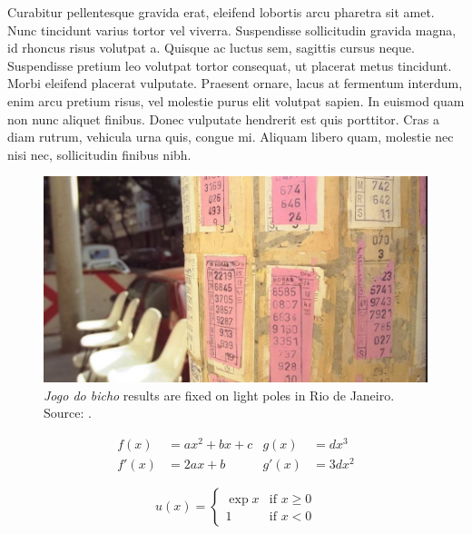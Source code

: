 \documentclass[a4paper,12pt]{article}
\begin{document}
Curabitur pellentesque gravida erat, eleifend lobortis arcu pharetra sit amet. Nunc tincidunt varius tortor vel viverra. Suspendisse sollicitudin gravida magna, id rhoncus risus volutpat a. Quisque ac luctus sem, sagittis cursus neque. Suspendisse pretium leo volutpat tortor consequat, ut placerat metus tincidunt. Morbi eleifend placerat vulputate. Praesent ornare, lacus at fermentum interdum, enim arcu pretium risus, vel molestie purus elit volutpat sapien. In euismod quam non nunc aliquet finibus. Donec vulputate hendrerit est quis porttitor. Cras a diam rutrum, vehicula urna quis, congue mi. Aliquam libero quam, molestie nec nisi nec, sollicitudin finibus nibh.

\begin{figure}[!htbp]
 \centering
 \includegraphics[width=\textwidth, height=6cm]{images/bicho05.jpg}
 \caption{\emph{Jogo do bicho} results are fixed on light poles in Rio de Janeiro. Source: \citet{gomes1998bicho}.}
 \label{fig:poste}
\end{figure}

\begin{align}
 f(x)  &= a x^2+b x +c   &   g(x)  &= d x^3 \\
 f'(x) &= 2 a x +b       &   g'(x) &= 3 d x^2
\end{align}


\begin{equation}
  u(x) =
  \begin{cases}
   \exp{x} & \text{if } x \geq 0 \\
   1       & \text{if } x < 0
  \end{cases}
\end{equation}


\def\onepc{$^{\ast\ast}$} \def\fivepc{$^{\ast}$}
\def\tenpc{$^{\dag}$}
\def\legend{\multicolumn{4}{l}{\footnotesize{Significance levels
:\hspace{1em} $\dag$ : .1 \hspace{1em}
$\ast$ : .05 \hspace{1em} $\ast\ast$ : .01 \normalsize}}}
\end{document}
